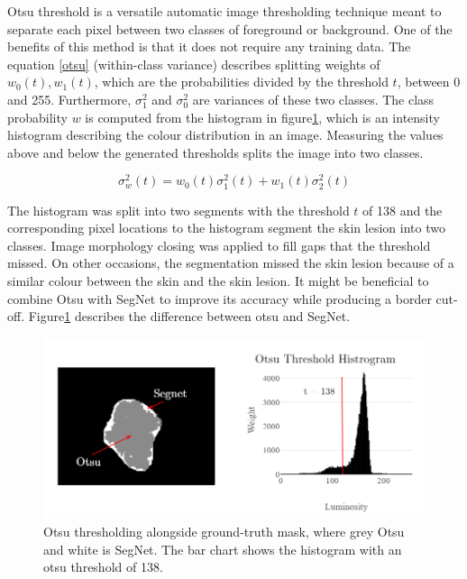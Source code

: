Otsu threshold is a versatile automatic image thresholding technique meant to separate each pixel between two classes of foreground or background. One of the benefits of this method is that it does not require any training data. The equation \ref{otsu} (within-class variance) describes splitting weights of $w_0(t),w_1(t)$, which are the probabilities divided by the threshold $t$, between 0 and 255. Furthermore, $\sigma_1^2$ and $\sigma_0^2$ are variances of these two classes. The class probability $w$ is computed from the histogram in figure\ref{otsu2}, which is an intensity histogram describing the colour distribution in an image. Measuring the values above and below the generated thresholds splits the image into two classes.

\begin{equation}
\sigma_w^2(t) = w_0(t)\sigma_1^2(t) + w_1(t)\sigma_2^2(t)
\end{equation}\label{otsu}

The histogram was split into two segments with the threshold $t$ of 138 and the corresponding pixel locations to the histogram segment the skin lesion into two classes. Image morphology closing was applied to fill gaps that the threshold missed. On other occasions, the segmentation missed the skin lesion because of a similar colour between the skin and the skin lesion. It might be beneficial to combine Otsu with SegNet to improve its accuracy while producing a border cut-off. Figure\ref{otsu2} describes the difference between otsu and SegNet.

\begin{figure}
\centering
\includegraphics[scale=0.7]{images/otsu3.png}
\caption{Otsu thresholding alongside ground-truth mask, where grey Otsu and white is SegNet. The bar chart shows the histogram with an otsu threshold of 138.}\label{otsu2}
\end{figure}

